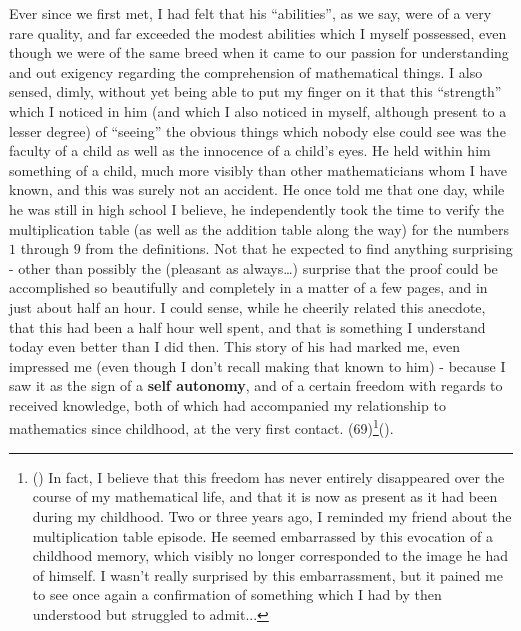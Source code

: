 Ever since we first met, I had felt that his ``abilities'', as we say, were of a very rare
quality, and far exceeded the modest abilities which I myself possessed, even though we
were of the same breed when it came to our passion for understanding and out exigency
regarding the comprehension of mathematical things.
I also sensed, dimly, without yet being able to put my finger on it that this ``strength''
which I noticed in him (and which I also noticed in myself, although present to a lesser
degree) of ``seeing'' the obvious things which nobody else could see was the faculty of a
child as well as the innocence of a child's eyes.
He held within him something of a child, much more visibly than other mathematicians whom
I have known, and this was surely not an accident.
He once told me that one day, while he was still in high school I believe,
he independently took the time to verify the multiplication table
(as well as the addition table along the way) 
for the numbers $1$ through $9$ from the definitions.
Not that he expected to find anything surprising - other than possibly the (pleasant as
always\ldots) surprise that the proof could be accomplished so beautifully and completely
in a matter of a few pages, and in just about half an hour.
I could sense, while he cheerily related this anecdote, that this had been a half hour
well spent, and that is something I understand today even better than I did then.
This story of his had marked me, even impressed me (even though I don't recall making that
known to him) - because I saw it as the sign of a \textbf{self autonomy},
and of a certain freedom with regards to received knowledge, both of which had accompanied
my relationship to mathematics since childhood, at the very first contact.
(69)\footnote{() In fact, I believe that this freedom has never entirely disappeared over the course of my mathematical life, and that it is now as present as it had been during my childhood. Two or three years ago, I reminded my friend about the multiplication table episode. He seemed embarrassed by this evocation of a childhood memory, which visibly no longer corresponded to the image he had of himself. I wasn't really surprised by this embarrassment, but it pained me to see once again a confirmation of something which I had by then understood but struggled to admit...}().

